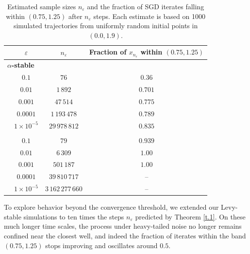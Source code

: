 \documentclass{article}
\theoremstyle{plain}
\theoremstyle{definition}
\theoremstyle{remark}
\begin{document}
\begin{table}[ht]
\centering
\small
\begin{tabular}{%
  l  %
  c  %
  c  %
  c  %
}
\toprule
& $\varepsilon$ 
& $n_{\varepsilon}$ 
& Fraction of $x_{n_\varepsilon}$ within $(0.75,1.25)$ \\
\midrule
\multicolumn{4}{l}{\textbf{$\alpha$-stable}}\\[-0.3em]
  & $0.1$     & $76$            & $0.36$ \\
  & $0.01$    & $1\,892$        & $0.701$ \\
  & $0.001$   & $47\,514$       & $0.775$ \\
  & $0.0001$  & $1\,193\,478$   & $0.789$ \\
  & $1\times10^{-5}$   & $29\,978\,812$  & $0.835$ \\
\addlinespace
\multicolumn{4}{l}{\textbf{Normal}}\\[-0.3em]
  & $0.1$     & $79$            & $0.939$ \\
  & $0.01$    & $6\,309$        & $1.00$  \\
  & $0.001$   & $501\,187$      & $1.00$  \\
  & $0.0001$  & $39\,810\,717$  & –       \\
  & $1\times10^{-5}$   & $3\,162\,277\,660$ & –  \\
\bottomrule
\end{tabular}
\caption{Estimated sample sizes $n_{\varepsilon}$ and the fraction of SGD iterates falling within $(0.75, 1.25)$ after $n_{\varepsilon}$ steps. Each estimate is based on 1000 simulated trajectories from uniformly random initial points in $(0.0, 1.9)$.}
\label{tab:neps}
\end{table}
%
To explore behavior beyond the convergence threshold, we extended our Levy-stable simulations to ten times the steps $n_{\varepsilon}$ predicted by Theorem \ref{t.1}. On these much longer time scales, the process under heavy-tailed noise no longer remains confined near the closest well, and indeed the fraction of iterates within the band $(0.75,1.25)$ stops improving and oscillates around $0.5$.
%
\end{document}
